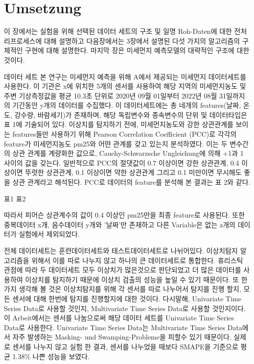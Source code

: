 \chapterpage\chapter{Umsetzung}
    이 장에서는 실험을 위해 선택된 데이터 세트의 구조 및 일명 Roh-Daten에 대한 전처리프로세스에 대해 설명하고 다음장에서는 3장에서 설명된 다섯 가지의 알고리즘의 구체적인 구현에 대해 설명한다. 마지막 장은 미세먼지 예측모델의 대략적인 구조에 대한 것이다.

    
    데이터 세트
        본 연구는 미세먼지 예측을 위해 A에서 제공되는 미세먼지 데이터세트를 사용한다. 이 기관은 x에 위치한 5개의 센서를 사용하여 해당 지역의 미세먼지농도 및 주변 기상측정값을 평균 10.3초 단위로 2020년 09월 01일부터 2022년 08월 31일까지의 기간동안 y개의 데이터를 수집했다. 이 데이터세트에는 총 네개의 features(날짜, 온도, 강수량, 바람세기)가 존재하며, 해당 독립변수와 종속변수의 단위 및 데이터타입은 표 1에 기술되어 있다. 이상치를 탐지하기 전에, 미세먼지농도와 강한 상관관계를 보이는 features들만 사용하기 위해 Pearson Correlation Coefficient (PCC)로 각각의 feature가 미세먼지농도 pm25와 어떤 관계를 갖고 있는지 분석하였다. 이는 두 변수간의 상관 관계를 계량화한 값으로, Cauchy-Schwarzsche Ungleichung에 의해 +1과 1 사이의 값을 갖는다. 일반적으로 PCC의 절댓값이 0.7 이상이면 강한 상관관계, 0.4 이상이면 뚜렷한 상관관계, 0.1 이상이면 약한 상관관계 그리고 0.1 미만이면 무시해도 좋을 상관 관계라고 해석된다. PCC로 데이터의 feature를 분석해 본 결과는 표 2와 같다.

        표1 표2
        
        따라서 피어슨 상관계수의 값이 0.4 이상인 pm25만을 최종 feature로 사용된다. 또한 중복데이터 x개, 음수데이터 y개와 '날짜'만 존재하고 다른 Variable은 없는 z개의 데이터가 실험에서 제외되었다.

        전체 데이터세트는 훈련데이터세트와 테스트데이터세트로 나뉘어있다. 이상치탐지 알고리즘을 위해서 이를 따로 나누지 않고 하나의 큰 데이터세트로 통합한다. 휴리스틱 관점에 따라 두 데이터세트 모두 이상치가 많은것으로 판단되었고 더 많은 데이터를 사용하여 이상치를 탐지하기 때문에 이상치 검출의 성능을 높일 수 있기 때문이다. 또 한가지 생각해 볼 것은 이상치탐지를 위해 각 센서를 따로 나누어서 탐지를 진행 할지, 모든 센서에 대해 한번에 탐지를 진행할지에 대한 것이다. 다시말해, Univariate Time Series Data로 사용할 것인지, Multivariate Time Series Data로 사용할 것인지이다. 이 Arbeit에서는 센서를 나눔으로써 해당 데이터 세트를 Univariate Time Series Data로 사용한다. Univariate Time Series Data는 Multivariate Time Series Data에서 자주 발생하는 Masking- und Swamping-Probleme을 피할수 있기 때문이다. 실제로 센서를 나누지 않고 실험 한 결과, 센서를 나누었을 때보다 SMAPE을 기준으로 평균 1.38\% 나쁜 성능을 보였다.

